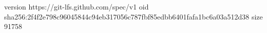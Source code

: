 version https://git-lfs.github.com/spec/v1
oid sha256:2f4f2e798c96045844c94eb317056c787fbf85edbb6401fafa1bc6a03a512d38
size 91758
